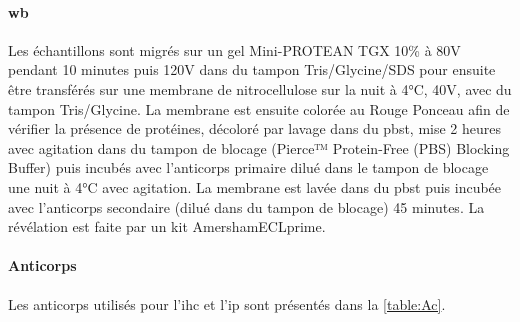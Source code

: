 \paragraph{\Acrlong{wb}}
\label{par:wb}
	Les échantillons sont migrés sur un gel Mini-PROTEAN\textregistered{}  TGX 10\% à 80V pendant 10 minutes puis 120V dans du tampon Tris/Glycine/SDS pour ensuite être transférés sur une membrane de nitrocellulose sur la nuit à 4°C, 40V, avec du tampon Tris/Glycine. La membrane est ensuite colorée au Rouge Ponceau afin de vérifier la présence de protéines, décoloré par lavage dans du \acrshort{pbst}, mise 2 heures avec agitation dans du tampon de blocage (Pierce™ Protein-Free (PBS) Blocking Buffer) puis incubés avec l'anticorps primaire dilué dans le tampon de blocage une nuit à 4°C avec agitation. La membrane est lavée dans du \acrshort{pbst} puis incubée avec l'anticorps secondaire (dilué dans du tampon de blocage) 45 minutes. La révélation est faite par un kit Amersham\texttrademark ECL\texttrademark prime.
		
\paragraph{Anticorps}
\label{par:anticorps}
	Les anticorps utilisés pour l'\acrfull{ihc} et l'\acrfull{ip} sont présentés dans la \cref{table:Ac}.
	
	\begin{table}[h]
	\end{table} 
	\FloatBarrier
	
